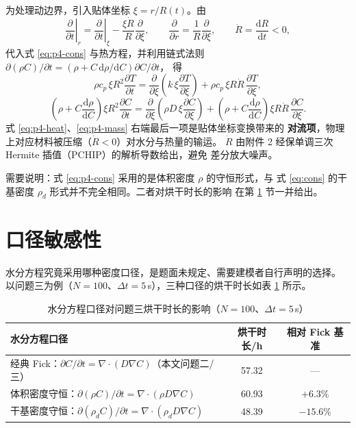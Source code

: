 \documentclass[12pt,a4paper,fontset=none]{ctexart}
\begin{document}
为处理动边界，引入贴体坐标 $\xi=r/R(t)$。由
\begin{equation}
  \left.\frac{\partial}{\partial t}\right|_{r}
  =\left.\frac{\partial}{\partial t}\right|_{\xi}
   -\frac{\xi\dot R}{R}\frac{\partial}{\partial\xi},
  \qquad
  \frac{\partial}{\partial r}=\frac{1}{R}\frac{\partial}{\partial\xi},
  \qquad \dot R=\frac{\mathrm{d}R}{\mathrm{d}t}<0,
\end{equation}
代入式 \eqref{eq:p4-cons} 与热方程，并利用链式法则
$\partial(\rho C)/\partial t=(\rho+C\,\mathrm{d}\rho/\mathrm{d}C)\partial C/\partial t$，
得
\begin{equation}
  \rho c_p\,\xi R^2\frac{\partial T}{\partial t}
  =\frac{\partial}{\partial\xi}
   \left(k\,\xi\frac{\partial T}{\partial\xi}\right)
   +\rho c_p\,\xi R\dot R\,\frac{\partial T}{\partial\xi},
  \label{eq:p4-heat}
\end{equation}
\begin{equation}
  \left(\rho+C\frac{\mathrm{d}\rho}{\mathrm{d}C}\right)\xi R^2
   \frac{\partial C}{\partial t}
  =\frac{\partial}{\partial\xi}
   \left(\rho D\,\xi\frac{\partial C}{\partial\xi}\right)
   +\left(\rho+C\frac{\mathrm{d}\rho}{\mathrm{d}C}\right)
    \xi R\dot R\,\frac{\partial C}{\partial\xi}.
  \label{eq:p4-mass}
\end{equation}
式 \eqref{eq:p4-heat}、\eqref{eq:p4-mass} 右端最后一项是贴体坐标变换带来的
\textbf{对流项}，物理上对应材料被压缩（$\dot R<0$）对水分与热量的输运。
$\dot R$ 由附件 2 经保单调三次 Hermite 插值（PCHIP）的解析导数给出，避免
差分放大噪声。

需要说明：式 \eqref{eq:p4-cons} 采用的是体积密度 $\rho$ 的守恒形式，与
式 \eqref{eq:cons} 的干基密度 $\rho_d$ 形式并不完全相同。二者对烘干时长的影响
在第 \ref{sec:sens} 节一并给出。

\section{口径敏感性}
\label{sec:sens}

水分方程究竟采用哪种密度口径，是题面未规定、需要建模者自行声明的选择。
以问题三为例（$N=100$、$\Delta t=5$\,s），三种口径的烘干时长如表
\ref{tab:clos} 所示。

\begin{table}[htbp]
  \centering
  \caption{水分方程口径对问题三烘干时长的影响（$N=100$、$\Delta t=5$\,s）}
  \label{tab:clos}
  \small
  \begin{tabular}{lcc}
    \toprule
    水分方程口径 & 烘干时长/h & 相对 Fick 基准 \\
    \midrule
    经典 Fick：$\partial C/\partial t=\nabla\!\cdot\!(D\nabla C)$（本文问题二/三）
      & 57.32 & --- \\
    体积密度守恒：$\partial(\rho C)/\partial t=\nabla\!\cdot\!(\rho D\nabla C)$
      & 60.93 & $+6.3\%$ \\
    干基密度守恒：$\partial(\rho_d C)/\partial t=\nabla\!\cdot\!(\rho_d D\nabla C)$
      & 48.39 & $-15.6\%$ \\
    \bottomrule
  \end{tabular}
\end{table}
\end{document}

